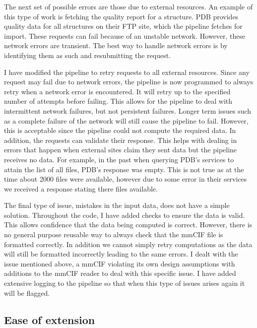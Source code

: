 The next set of possible errors are those due to external resources. An example
of this type of work is fetching the quality report for a structure. PDB
provides quality data for all structures on their FTP site, which the pipeline
fetches for import. These requests can fail because of an unstable network.
However, these network errors are transient. The best way to handle network
errors is by identifying them as such and resubmitting the request.

I have modified the pipeline to retry requests to all external resources. Since
any request may fail due to network errors, the pipeline is now programmed to
always retry when a network error is encountered. It will retry up to the
specified number of attempts before failing. This allows for the pipeline to
deal with intermittent network failures, but not persistent failures. Longer
term issues such as a complete failure of the network will still cause the
pipeline to fail. However, this is acceptable since the pipeline could not
compute the required data. In addition, the requests can validate their
response. This helps with dealing in errors that happen when external sites
claim they sent data but the pipeline receives no data. For example, in the past
when querying PDB's services to attain the list of all files, PDB's response was
empty. This is not true as at the time about 2000 files were available, however
due to some error in their services we received a response stating there files
available.

The final type of issue, mistakes in the input data, does not have a simple
solution. Throughout the code, I have added checks to ensure the data is valid.
This allows confidence that the data being computed is correct. However, there
is no general purpose reusable way to always check that the mmCIF file is
formatted correctly. In addition we cannot simply retry computations as the data
will still be formatted incorrectly leading to the same errors. I dealt with the
issue mentioned above, a mmCIF violating its own design assumptions with
additions to the mmCIF reader to deal with this specific issue. I have added
extensive logging to the pipeline so that when this type of issues arises again
it will be flagged.

\subsection{Ease of extension}

